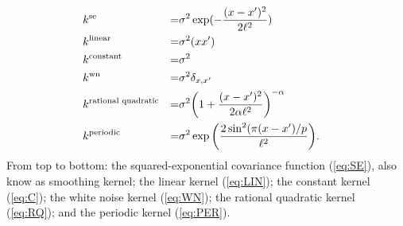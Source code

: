 \begin{align}
&k^\text{se} &=& \sigma^2 \exp(-\frac{(x-x^\prime)^2}{2\ell^2}) \label{eq:SE}\\
&k^\text{linear} &=&   \sigma^2(x x^\prime) \label{eq:LIN}\\
&k^{\text{constant}} &=&   \sigma^2\label{eq:C}\\
&k^\text{wn} &=& \sigma^2 \delta_{x,x^\prime} \label{eq:WN} \\
&k^{\text{rational quadratic}}  &=&    \sigma^2 \bigg(1 + \frac{(x - x^\prime)^2}{2 \alpha \ell^2} \bigg)^{-\alpha} 
&\label{eq:RQ} \\
&k^\text{periodic} &=&  \sigma^2 \exp \bigg( \frac{2 \sin^2 ( \pi (x - x^\prime)/p}{\ell^2} \bigg). \label{eq:PER}
\end{align}
From top to bottom: the squared-exponential covariance function (\ref{eq:SE}),
also know as smoothing kernel; the linear kernel (\ref{eq:LIN});  the constant 
kernel (\ref{eq:C}); the white noise
kernel (\ref{eq:WN}); the
rational quadratic kernel (\ref{eq:RQ}); and the periodic kernel (\ref{eq:PER}).

